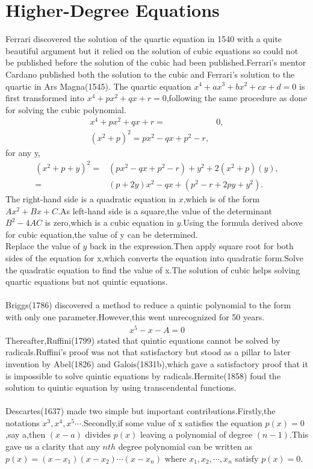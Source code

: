 \documentclass[a4paper,reqno,11pt]{book}
\theoremstyle{plain}%
\theoremstyle{definition}
\begin{document}
\section{Higher-Degree Equations}
Ferrari discovered the solution of the quartic equation in 1540 with a quite beautiful argument but it relied on the solution of cubic equations so could not be published before the solution of the cubic had been published.Ferrari's mentor Cardano published both the solution to the cubic and Ferrari's solution to the quartic in Ars Magna(1545).\cite{ref 6}
The quartic equation $x^4+ax^3+bx^2+cx+d=0$ is first transformed into $x^4+px^2+qx+r=0$,following the same procedure as done for solving the cubic polynomial.
\begin{align*}
    x^4+px^2+qx+r=&0,\\
    (x^2+p)^2=px^2-qx+p^2-r,
\end{align*}
for any y,
\begin{align*}
    (x^2+p+y)^2=&(px^2-qx+p^2-r)+y^2+2(x^2+p)(y),\\
              =&(p+2y)x^2-qx+(p^2-r+2py+y^2).
\end{align*}
The right-hand side is a quadratic equation in $x$,which is of the form $Ax^2+Bx+C$.As left-hand side is a square,the value of the determinant $B^2-4AC$ is zero,which is a cubic equation in $y$.Using the formula derived above for cubic equation,the value of y can be determined.\\
Replace the value of $y$ back in the expression.Then apply square root for both sides of the equation for x,which converts the equation into quadratic form.Solve the quadratic equation to find the value of x.The solution of cubic helps solving quartic equations but not quintic equations.\\
\\
Briggs(1786) discovered a method to reduce a quintic polynomial to the form with only one parameter.However,this went unrecognized for 50 years.
\begin{eqnarray*}
    x^5-x-A=0
\end{eqnarray*}
Thereafter,Ruffini(1799) stated that quintic equations cannot be solved by radicals.Ruffini's proof was not that satisfactory but stood as a pillar to later invention by Abel(1826) and Galois(1831b),which gave a satisfactory proof that it is impossible to solve quintic equations by radicals.Hermite(1858) foud the solution to quintic equation by using transcendental functions.\\
\\
Descartes(1637) made two simple but important contributions.Firstly,the notations $x^3,x^4,x^5\cdots$.Secondly,if some value of x satisfies the equation $p(x)=0$,say a,then $(x-a)$ divides $p(x)$ leaving a polynomial of degree $(n-1)$.This gave us a clarity that any $nth$ degree polynomial can be written as $p(x)=(x-x_{1})(x-x_{2})\cdots(x-x_{n})$ where $x_{1},x_{2},\cdots,x_{n}$ satisfy $p(x)=0$.
\end{document}
